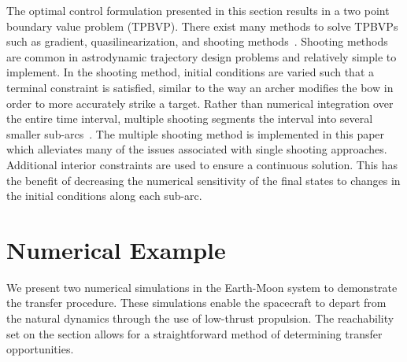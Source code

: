 \documentclass[preprint]{elsarticle}
\begin{document}
The optimal control formulation presented in this section results in a two point boundary value problem (TPBVP). 
There exist many methods to solve TPBVPs such as gradient, quasilinearization, and shooting methods~\cite{bryson1975,kirk2012}.
Shooting methods are common in astrodynamic trajectory design problems and relatively simple to implement.
In the shooting method, initial conditions are varied such that a terminal constraint is satisfied, similar to the way an archer modifies the bow in order to more accurately strike a target. 
Rather than numerical integration over the entire time interval, multiple shooting segments the interval into several smaller sub-arcs~\cite{stoer2013}.
The multiple shooting method is implemented in this paper which alleviates many of the issues associated with single shooting approaches.
Additional interior constraints are used to ensure a continuous solution.
This has the benefit of decreasing the numerical sensitivity of the final states to changes in the initial conditions along each sub-arc.
\section{Numerical Example}\label{sec:simulation}
We present two numerical simulations in the Earth-Moon system to demonstrate the transfer procedure.
These simulations enable the spacecraft to depart from the natural dynamics through the use of low-thrust propulsion.
The reachability set on the \Poincare section allows for a straightforward method of determining transfer opportunities.
\end{document}
